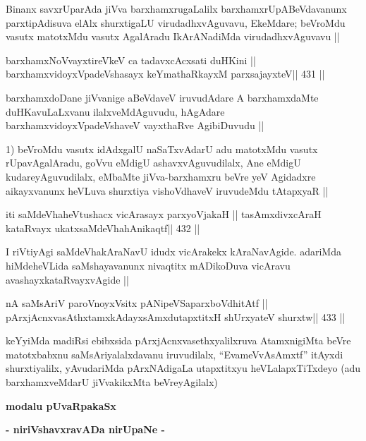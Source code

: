\begin{artha}
Binanx savxrUparAda jiVva barxhamxrugaLalilx barxhamxrUpABeVdavanunx
parxtipAdisuva elAlx shurxtigaLU virudadhxvAguvavu, EkeMdare; beVroMdu
vasutx matotxMdu vasutx AgalAradu IkArANadiMda virudadhxvAguvavu ||
\end{artha}

\begin{shl}
barxhamxNoV\s vayxtireVkeV ca tadavxcAcxsati duHKini ||
barxhamxvidoyxVpadeVshasayx keYmathaRkayxM parxsajayxteV\hfill || 431 ||
\end{shl}

\begin{artha}
barxhamxdoDane jiVvanige aBeVdaveV iruvudAdare A barxhamxdaMte
duHKavuLaLxvanu ilalxveMdAguvudu, hAgAdare barxhamxvidoyxVpadeVshaveV
vayxthaRve AgibiDuvudu ||
\end{artha}

\begin{artha}
1) beVroMdu vasutx idAdxgalU naSaTxvAdarU adu matotxMdu vasutx
rUpavAgalAradu, goVvu eMdigU ashavxvAguvudilalx, Ane eMdigU
kudareyAguvudilalx, eMbaMte jiVva-barxhamxru beVre yeV Agidadxre
aikayxvanunx heVLuva shurxtiya vishoVdhaveV iruvudeMdu tAtapxyaR ||
\end{artha}

\begin{shl}
iti saMdeVhaheVtushacx vicArasayx parxyoVjakaH ||
tasAmxdivxcAraH kataRvayx ukatxsaMdeVhahAnikaqtf\hfill || 432 ||
\end{shl}

\begin{artha}
I riVtiyAgi saMdeVhakAraNavU idudx vicArakekx kAraNavAgide. adariMda
hiMdeheVLida saMshayavanunx nivaqtitx mADikoDuva vicAravu
avashayxkataRvayxvAgide ||
\end{artha}

\begin{shl}
nA saMsAriV paroV\s noyxV\s sitx pANipeVSaparxboVdhitAtf ||
pArxjAcnxvasAthxtamxkAdayxsAmxdutapxtitxH shUrxyateV shurxtw\hfill || 433 ||
\end{shl}

\begin{artha}
keYyiMda madiRsi ebibxsida pArxjAcnxvasethxyalilxruva AtamxnigiMta
beVre matotxbabxnu saMsAriyalalxdavanu iruvudilalx, ``EvameVvAsAmxtf''
itAyxdi shurxtiyalilx, yAvudariMda pArxNAdigaLa utapxtitxyu
heVLalapxTiTxdeyo (adu barxhamxveMdarU jiVvakikxMta beVreyAgilalx)
\end{artha}

\begin{center}
{\LARGE{\textbf{modalu pUvaRpakaSx}}}

\medskip

{\large{\textbf{- niriVshavxravADa nirUpaNe -}}}
\end{center}


